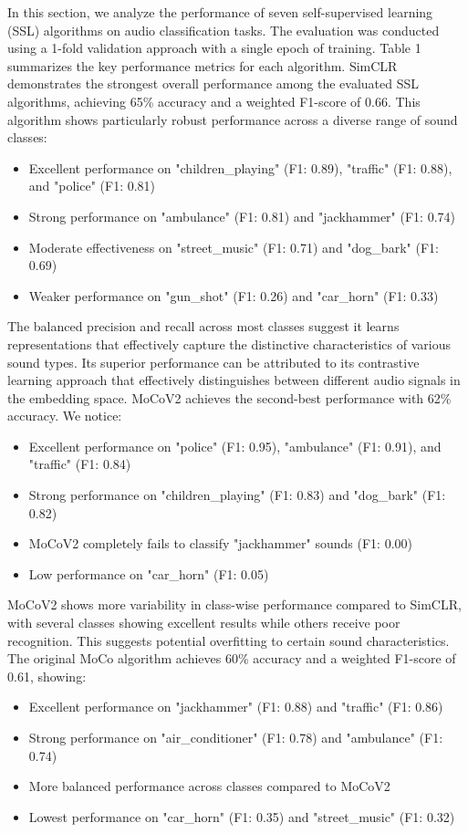 \documentclass[11pt]{article}
\begin{document}
In this section, we analyze the performance of seven self-supervised learning (SSL) algorithms on audio classification tasks. The evaluation was conducted using a 1-fold validation approach with a single epoch of training. Table 1 summarizes the key performance metrics for each algorithm.
SimCLR demonstrates the strongest overall performance among the evaluated SSL algorithms, achieving 65\% accuracy and a weighted F1-score of 0.66. This algorithm shows particularly robust performance across a diverse range of sound classes:
\begin{itemize}
    \item Excellent performance on "children\_playing" (F1: 0.89), "traffic" (F1: 0.88), and "police" (F1: 0.81)
    \item Strong performance on "ambulance" (F1: 0.81) and "jackhammer" (F1: 0.74)
    \item Moderate effectiveness on "street\_music" (F1: 0.71) and "dog\_bark" (F1: 0.69)
    \item Weaker performance on "gun\_shot" (F1: 0.26) and "car\_horn" (F1: 0.33)
\end{itemize}
The balanced precision and recall across most classes suggest it learns representations that effectively capture the distinctive characteristics of various sound types. Its superior performance can be attributed to its contrastive learning approach that effectively distinguishes between different audio signals in the embedding space.
MoCoV2 achieves the second-best performance with 62\% accuracy. We notice:
\begin{itemize}
    \item Excellent performance on "police" (F1: 0.95), "ambulance" (F1: 0.91), and "traffic" (F1: 0.84)
    \item Strong performance on "children\_playing" (F1: 0.83) and "dog\_bark" (F1: 0.82)
    \item MoCoV2 completely fails to classify "jackhammer" sounds (F1: 0.00)
    \item Low performance on "car\_horn" (F1: 0.05)
\end{itemize}
MoCoV2 shows more variability in class-wise performance compared to SimCLR, with several classes showing excellent results while others receive poor recognition. This suggests potential overfitting to certain sound characteristics.
The original MoCo algorithm achieves 60\% accuracy and a weighted F1-score of 0.61, showing:
\begin{itemize}
    \item Excellent performance on "jackhammer" (F1: 0.88) and "traffic" (F1: 0.86)
    \item Strong performance on "air\_conditioner" (F1: 0.78) and "ambulance" (F1: 0.74)
    \item More balanced performance across classes compared to MoCoV2
    \item Lowest performance on "car\_horn" (F1: 0.35) and "street\_music" (F1: 0.32)
\end{itemize}
\end{document}
